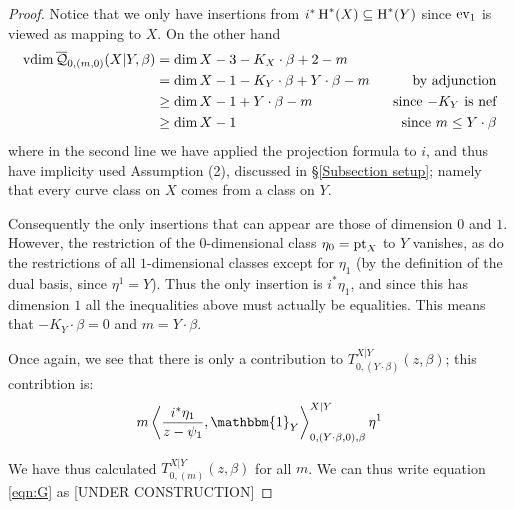 \begin{proof}
Notice that we only have insertions from $i^*\operatorname{H}^*(X) \subseteq \operatorname{H}^*(Y)$ since $\operatorname{ev}_1$ is viewed as mapping to $X$. On the other hand
\begin{align*} \operatorname{vdim} \overline{\mathcal Q}_{0,(m,0)}(X|Y,\beta) & = \dim X-3 -K_X \cdot \beta +2-m & \\
& = \dim X - 1 -K_Y \cdot \beta + Y \cdot \beta - m \ \ & \text{by adjunction} \\
& \geq \dim X - 1 + Y\cdot\beta - m \ \ & \text{since $-K_Y$ is nef} \\
& \geq \dim X - 1 \ \ & \text{since $m \leq Y \cdot \beta$} \end{align*}
where in the second line we have applied the projection formula to $i$, and thus have implicity used Assumption (2), discussed in \S \ref{Subsection setup}; namely that every curve class on $X$ comes from a class on $Y$.

Consequently the only insertions that can appear are those of dimension $0$ and $1$. However, the restriction of the $0$-dimensional class $\eta_0 = \operatorname{pt}_X$ to $Y$ vanishes, as do the restrictions of all $1$-dimensional classes except for $\eta_1$ (by the definition of the dual basis, since $\eta^1 = Y$). Thus the only insertion is $i^*\eta_1$, and since this has dimension $1$ all the inequalities above must actually be equalities. This means that $-K_Y \cdot \beta = 0$ and $m = Y \cdot \beta$.

Once again, we see that there is only a contribution to $T_{0,(Y\cdot\beta)}^{X|Y}(z,\beta)$; this contribtion is:
\begin{equation*} m \left\langle \dfrac{i^* \eta_1}{z-\psi_1} , \mathbbm{1}_Y \right\rangle_{0,(Y \cdot \beta,0),\beta}^{X|Y} \eta^1 \end{equation*}

We have thus calculated $T_{0,(m)}^{X|Y}(z,\beta)$ for all $m$. We can thus write equation \eqref{eqn:G} as [UNDER CONSTRUCTION]





\end{proof}

